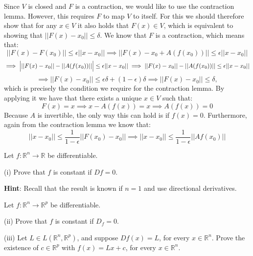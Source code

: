 \begin{solution}

    Since $V$ is closed and $F$ is a contraction, we would like to use the contraction lemma. 
    However, this requires $F$ to map $V$ to itself.
    For this we should therefore show that for any $x \in V$ it also holds that $F(x) \in V$,
    which is equivalent to showing that $\lvert \lvert F(x) - x_0 \rvert \rvert \leq \delta$.
    We know that $F$ is a contraction, which means that:
    $$\lvert \lvert F(x) - F(x_0) \rvert \rvert \leq \epsilon \lvert \lvert x - x_0 \rvert \rvert \implies \lvert \lvert F(x) - x_0 + A(f(x_0)) \rvert \rvert \leq \epsilon \lvert \lvert x - x_0 \rvert \rvert$$
    $$\implies \Bigl \lvert \lvert \lvert F(x) - x_0 \rvert \rvert - \lvert \lvert A(f(x_0)) \rvert \rvert \Bigr \rvert \leq \epsilon \lvert \lvert x - x_0 \rvert \rvert \implies \lvert \lvert F(x) - x_0 \rvert \rvert - \lvert \lvert A(f(x_0)) \rvert \rvert \leq \epsilon \lvert \lvert x - x_0 \rvert \rvert$$
    $$\implies \lvert \lvert F(x) - x_0 \rvert \rvert \leq \epsilon\delta + (1 - \epsilon)\delta \implies \lvert \lvert F(x) - x_0 \rvert \rvert \leq \delta,$$
    which is precisely the condition we require for the contraction lemma.
    By applying it we have that there exists a unique $x \in V$ such that:
    $$F(x) = x \implies x - A(f(x)) = x \implies A(f(x)) = 0$$
    Because $A$ is invertible, the only way this can hold is if $f(x) = 0$.
    Furthermore, again from the contraction lemma we know that:
    $$\lvert \lvert x - x_0 \rvert \rvert \leq \frac{1}{1 - \epsilon}\lvert \lvert F(x_0) - x_0 \rvert \rvert \implies \lvert \lvert x - x_0 \rvert \rvert \leq \frac{1}{1 - \epsilon} \lvert \lvert A f(x_0) \rvert \rvert$$
\end{solution}

\begin{exercise}{8}
    Let $f: \mathbb{R}^n \rightarrow \mathbb{R}$ be differentiable.

    (i) Prove that $f$ is constant if $D f = 0$.

    \textbf{Hint}: Recall that the result is known if $n = 1$ and use directional derivatives.

    Let $f: \mathbb{R}^n \rightarrow \mathbb{R}^p$ be differentiable.

    (ii) Prove that $f$ is constant if $D_f = 0$.

    (iii) Let $L \in L(\mathbb{R}^n, \mathbb{R}^p)$, and suppose $Df(x) = L$, for every $x \in \mathbb{R}^n$. Prove the existence of $c \in \mathbb{R}^p$ with $f(x) = Lx + c$, for every $x \in \mathbb{R}^n$.
\end{exercise}

